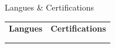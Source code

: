 \documentclass{resume}
\begin{document}
\begin{rSection}{Langues \& Certifications}
\begin{tabular}{ @{} p{}  p{} }
\textbf{Langues} & \textbf{Certifications} \\
{%
{%
{%
{%
 & \\
{%
{%
{%
{%
{%
{%
{%
{%
\end{tabular}
\end{rSection}
\end{document}
